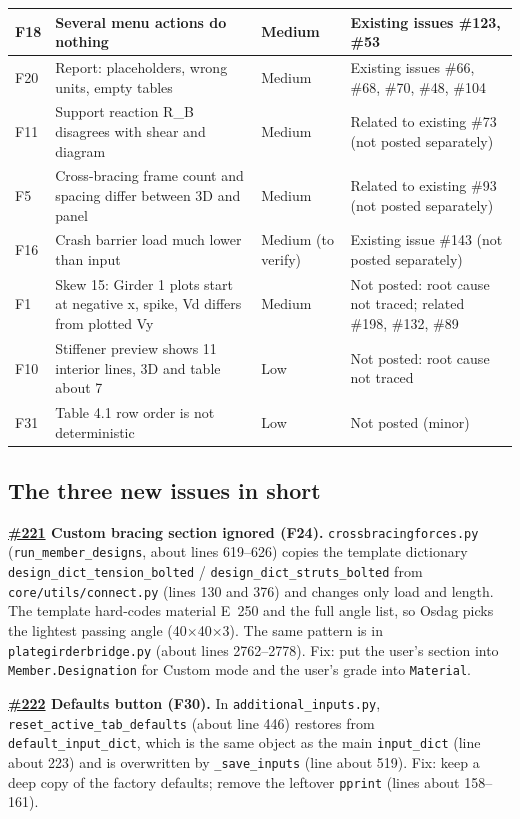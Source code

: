 \documentclass[10pt,a4paper]{article}
\begin{document}
{\begin{longtable}{|p{1.1cm}|p{12cm}|p{3cm}|p{7cm}|}
F18 & Several menu actions do nothing & Medium & Existing issues \#123, \#53 \\ \hline
F20 & Report: placeholders, wrong units, empty tables & Medium & Existing issues \#66, \#68, \#70, \#48, \#104 \\ \hline
F11 & Support reaction R\_B disagrees with shear and diagram & Medium & Related to existing \#73 (not posted separately) \\ \hline
F5 & Cross-bracing frame count and spacing differ between 3D and panel & Medium & Related to existing \#93 (not posted separately) \\ \hline
F16 & Crash barrier load much lower than input & Medium (to verify) & Existing issue \#143 (not posted separately) \\ \hline
F1 & Skew 15: Girder 1 plots start at negative x, spike, Vd differs from plotted Vy & Medium & Not posted: root cause not traced; related \#198, \#132, \#89 \\ \hline
F10 & Stiffener preview shows 11 interior lines, 3D and table about 7 & Low & Not posted: root cause not traced \\ \hline
F31 & Table 4.1 row order is not deterministic & Low & Not posted (minor) \\ \hline
\end{longtable}}

\subsection*{The three new issues in short}
\textbf{\href{https://github.com/Nidhikhare12/OsdagBridge/issues/221}{\#221} Custom bracing section ignored (F24).} \texttt{crossbracingforces.py} (\texttt{run\_member\_designs}, about lines 619--626) copies the template dictionary \texttt{design\_dict\_tension\_bolted} / \texttt{design\_dict\_struts\_bolted} from \texttt{core/utils/connect.py} (lines 130 and 376) and changes only load and length. The template hard-codes material E~250 and the full angle list, so Osdag picks the lightest passing angle (40$\times$40$\times$3). The same pattern is in \texttt{plategirderbridge.py} (about lines 2762--2778). Fix: put the user's section into \texttt{Member.Designation} for Custom mode and the user's grade into \texttt{Material}.

\textbf{\href{https://github.com/Nidhikhare12/OsdagBridge/issues/222}{\#222} Defaults button (F30).} In \texttt{additional\_inputs.py}, \texttt{reset\_active\_tab\_defaults} (about line 446) restores from \texttt{default\_input\_dict}, which is the same object as the main \texttt{input\_dict} (line about 223) and is overwritten by \texttt{\_save\_inputs} (line about 519). Fix: keep a deep copy of the factory defaults; remove the leftover \texttt{pprint} (lines about 158--161).
\end{document}
